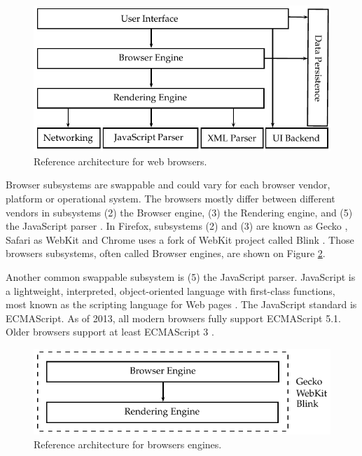 \begin{figure}[!htb]
  \centering
  \includegraphics{chapters/basic_concepts/web_architecture.pdf}
  \caption{Reference architecture for web browsers.}
  \label{figure:web_architecture}
\end{figure}

Browser subsystems are swappable \cite{Grosskurth2005} and could vary for each browser vendor, platform or operational system. The browsers mostly differ between different vendors in subsystems (2) the Browser engine, (3) the Rendering engine, and (5) the JavaScript parser  \cite{Firefox2013,Safari2013,WebKit2013,Chrome2010}. In Firefox, subsystems (2) and (3) are known as Gecko \cite{Firefox2013,Gecko2013}, Safari as WebKit \cite{Safari2013,WebKit2013} and Chrome uses a fork of WebKit project called Blink \cite{Chrome2010,Blink2013}. Those browsers subsystems, often called Browser engines, are shown on Figure \ref{figure:web_architecture_engines}.

Another common swappable subsystem is (5) the JavaScript parser. JavaScript \cite{International2009} is a lightweight, interpreted, object-oriented language with first-class functions, most known as the scripting language for Web pages \cite{Gecko2013}. The JavaScript standard is ECMAScript. As of 2013, all modern browsers fully support ECMAScript 5.1. Older browsers support at least ECMAScript 3 \cite{Gecko2013,International2009}.

\begin{figure}[!htb]
  \centering
  \includegraphics{chapters/basic_concepts/web_architecture_engines.pdf}
  \caption{Reference architecture for browsers engines.}
  \label{figure:web_architecture_engines}
\end{figure}

